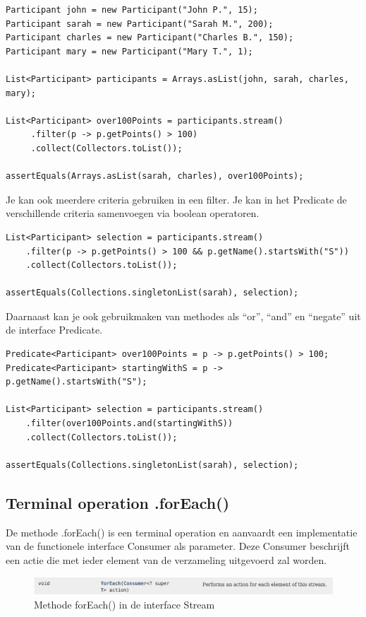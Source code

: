 \documentclass{tstextbook}
\begin{document}
\begin{lstlisting}
Participant john = new Participant("John P.", 15);
Participant sarah = new Participant("Sarah M.", 200);
Participant charles = new Participant("Charles B.", 150);
Participant mary = new Participant("Mary T.", 1);

List<Participant> participants = Arrays.asList(john, sarah, charles, mary);

List<Participant> over100Points = participants.stream()
     .filter(p -> p.getPoints() > 100)
     .collect(Collectors.toList());

assertEquals(Arrays.asList(sarah, charles), over100Points);
\end{lstlisting}

Je kan ook meerdere criteria gebruiken in een filter. Je kan in het Predicate de verschillende criteria samenvoegen via boolean operatoren.

\begin{lstlisting}
List<Participant> selection = participants.stream()
    .filter(p -> p.getPoints() > 100 && p.getName().startsWith("S"))
    .collect(Collectors.toList());
    
assertEquals(Collections.singletonList(sarah), selection);
\end{lstlisting}

Daarnaast kan je ook gebruikmaken van methodes als ``or'',  ``and'' en ``negate'' uit de interface Predicate.
		
\begin{lstlisting}
Predicate<Participant> over100Points = p -> p.getPoints() > 100;
Predicate<Participant> startingWithS = p -> p.getName().startsWith("S");

List<Participant> selection = participants.stream()
    .filter(over100Points.and(startingWithS))
    .collect(Collectors.toList());

assertEquals(Collections.singletonList(sarah), selection);
\end{lstlisting}

\subsection{Terminal operation .forEach()}

De methode .forEach() is een terminal operation en aanvaardt een implementatie van de functionele interface Consumer als parameter. Deze Consumer beschrijft een actie die met ieder element van de verzameling uitgevoerd zal worden.

\begin{figure}[H]
  \includegraphics[width=\linewidth]{images/h6/stream_forEach.png}
  \caption{Methode forEach() in de interface Stream}
  \label{fig:stream_foreach}
\end{figure}
\end{document}
